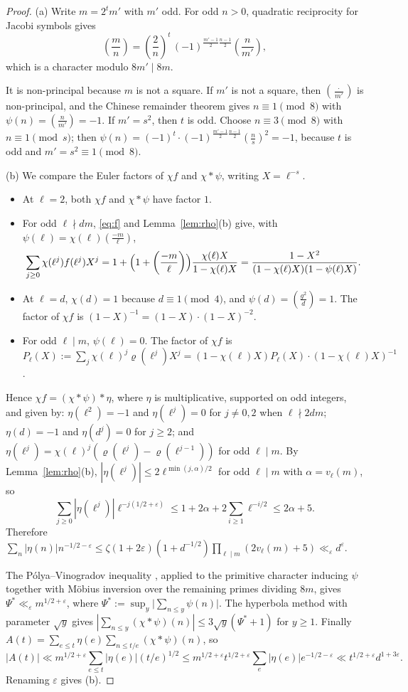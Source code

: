 \documentclass[11pt]{amsart}
\theoremstyle{remark}
\theoremstyle{definition}
\numberwithin{equation}{section}
\newcommand{\eps}{\varepsilon}
\newcommand{\leg}[2]{\left(\frac{#1}{#2}\right)}
\begin{document}
\begin{proof}
(a) Write $m=2^tm'$ with $m'$ odd. For odd $n>0$, quadratic reciprocity for Jacobi symbols gives
\[
\leg mn=\leg2n^t\,(-1)^{\frac{m'-1}2\frac{n-1}2}\leg n{m'},
\]
which is a character modulo $8m'\mid 8m$.

It is non-principal because $m$ is not a square. If $m'$ is not a square, then $\leg{\cdot}{m'}$ is non-principal, and the Chinese remainder theorem gives $n\equiv1\pmod 8$ with $\psi(n)=\leg n{m'}=-1$. If $m'=s^2$, then $t$ is odd. Choose $n\equiv3\pmod 8$ with $n\equiv1\pmod s$; then $\psi(n)=(-1)^t\cdot(-1)^{\frac{m'-1}2\frac{n-1}2}\leg ns^2=-1$, because $t$ is odd and $m'=s^2\equiv1\pmod 8$.

(b) We compare the Euler factors of $\chi f$ and $\chi*\psi$, writing $X=\ell^{-s}$.
\begin{itemize}
\item At $\ell=2$, both $\chi f$ and $\chi*\psi$ have factor $1$.
\item For odd $\ell\nmid dm$, \eqref{eq:f} and Lemma~\ref{lem:rho}(b) give, with $\psi(\ell)=\chi(\ell)\leg{-m}\ell$,
\[
\sum_{j\ge0}\chi(\ell^j)f(\ell^j)X^j=1+\Bigl(1+\leg{-m}\ell\Bigr)\frac{\chi(\ell)X}{1-\chi(\ell)X}=\frac{1-X^2}{(1-\chi(\ell)X)(1-\psi(\ell)X)}.
\]
\item At $\ell=d$, $\chi(d)=1$ because $d\equiv1\pmod 4$, and $\psi(d)=\leg{g^2}d=1$. The factor of $\chi f$ is $(1-X)^{-1}=(1-X)\cdot(1-X)^{-2}$.
\item For odd $\ell\mid m$, $\psi(\ell)=0$. The factor of $\chi f$ is $P_\ell(X):=\sum_j\chi(\ell)^j\varrho(\ell^j)X^j=(1-\chi(\ell)X)P_\ell(X)\cdot(1-\chi(\ell)X)^{-1}$.
\end{itemize}
Hence $\chi f=(\chi*\psi)*\eta$, where $\eta$ is multiplicative, supported on odd integers, and given by: $\eta(\ell^2)=-1$ and $\eta(\ell^j)=0$ for $j\ne0,2$ when $\ell\nmid 2dm$; $\eta(d)=-1$ and $\eta(d^j)=0$ for $j\ge2$; and $\eta(\ell^j)=\chi(\ell)^j(\varrho(\ell^j)-\varrho(\ell^{j-1}))$ for odd $\ell\mid m$. By Lemma~\ref{lem:rho}(b), $|\eta(\ell^j)|\le 2\ell^{\min(j,\alpha)/2}$ for odd $\ell\mid m$ with $\alpha=v_\ell(m)$, so
\[
\sum_{j\ge0}|\eta(\ell^j)|\ell^{-j(1/2+\eps)}\le1+2\alpha+2\sum_{i\ge1}\ell^{-i/2}\le2\alpha+5 .
\]
Therefore $\sum_n|\eta(n)|n^{-1/2-\eps}\le\zeta(1+2\eps)(1+d^{-1/2})\prod_{\ell\mid m}(2v_\ell(m)+5)\ll_\eps d^{\eps}$.

The P\'olya--Vinogradov inequality \cite[Ch.~23]{Da}, applied to the primitive character inducing $\psi$ together with M\"obius inversion over the remaining primes dividing $8m$, gives $\Psi^*\ll_\eps m^{1/2+\eps}$, where $\Psi^*:=\sup_y\bigl|\sum_{n\le y}\psi(n)\bigr|$. The hyperbola method with parameter $\sqrt y$ gives $|\sum_{n\le y}(\chi*\psi)(n)|\le3\sqrt y(\Psi^*+1)$ for $y\ge1$. Finally $A(t)=\sum_{e\le t}\eta(e)\sum_{n\le t/e}(\chi*\psi)(n)$, so
\[
|A(t)|\ll m^{1/2+\eps}\sum_{e\le t}|\eta(e)|(t/e)^{1/2}\le m^{1/2+\eps}t^{1/2+\eps}\sum_e|\eta(e)|e^{-1/2-\eps}\ll t^{1/2+\eps}d^{1+3\eps}.
\]
Renaming $\eps$ gives (b).


\end{proof}
\end{document}
